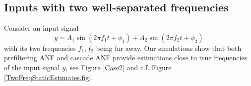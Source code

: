 \documentclass{UCF_ETD}
\begin{document}
\subsection{Inputs with two well-separated frequencies}
\label{tsf.subsection}

Consider an input signal
\begin{equation}\label{sumoftwo.def}
y=A_1\sin (2 \pi f_1 t+\phi_1)+ A_2\sin(2\pi f_2 t+\phi_2)\end{equation}
with its two frequencies  $f_1, f_2$ being far away.
Our simulations show that
 both prefiltering ANF and cascade ANF provide  estimations close to true frequencies
 of the input signal $y$,
  see Figure %
  \ref{Case2}
   and c.f. Figure \ref{TwoFreqStaticEstimates.fig}.
\end{document}
